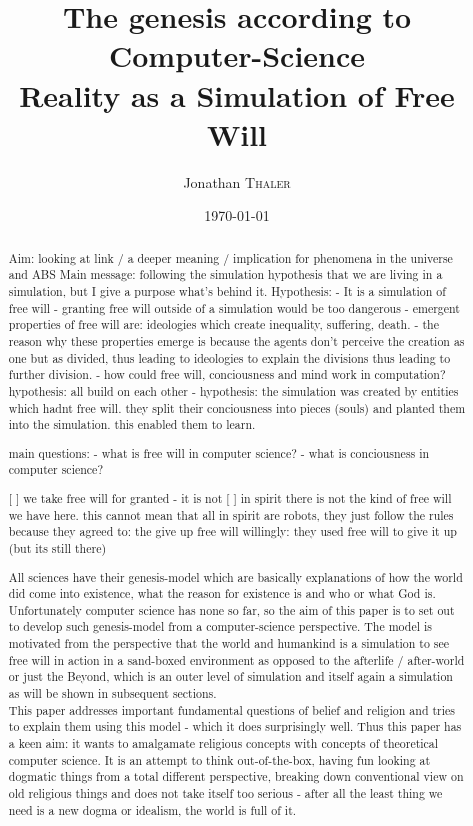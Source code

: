 \documentclass[twocolumn]{article}
\title{The genesis according to Computer-Science \\ Reality as a Simulation of Free Will} %
\author{Jonathan \textsc{Thaler}} %
\date{\today} %
\begin{document}
\maketitle %

\begin{abstract}
Aim: looking at link / a deeper meaning / implication for phenomena in the universe and ABS
Main message: following the simulation hypothesis that we are living in a simulation, but I give a purpose what's behind it. 
	Hypothesis: 
		- It is a simulation of free will 
		- granting free will outside of a simulation would be too dangerous
		- emergent properties of free will are: ideologies which create inequality, suffering, death. 
		- the reason why these properties emerge is because the agents don't perceive the creation as one but as divided, thus leading to ideologies to explain the divisions thus leading to further division.
		- how could free will, conciousness and mind work in computation? hypothesis: all build on each other
		- hypothesis: the simulation was created by entities which hadnt free will. they split their conciousness into pieces (souls) and planted them into the simulation. this enabled them to learn.

main questions: 
	- what is free will in computer science?
	- what is conciousness in computer science?

[ ] we take free will for granted - it is not
[ ] in spirit there is not the kind of free will we have here. this cannot mean that all in spirit are robots, they just follow the rules because they agreed to: the give up free will willingly: they used free will to give it up (but its still there)

All sciences have their genesis-model which are basically explanations of how the world did come into existence, what the reason for existence is and who or what God is. Unfortunately computer science has none so far, so the aim of this paper is to set out to develop such genesis-model from a computer-science perspective. The model is motivated from the perspective that the world and humankind is a simulation to see free will in action in a sand-boxed environment as opposed to the afterlife / after-world or just the Beyond, which is an outer level of simulation and itself again a simulation as will be shown in subsequent sections. \\
This paper addresses important fundamental questions of belief and religion and tries to explain them using this model - which it does surprisingly well. Thus this paper has a keen aim: it wants to amalgamate religious concepts with concepts of theoretical computer science. It is an attempt to think out-of-the-box, having fun looking at dogmatic things from a total different perspective, breaking down conventional view on old religious things and does not take itself too serious - after all the least thing we need is a new dogma or idealism, the world is full of it.


\end{abstract}
\end{document}
